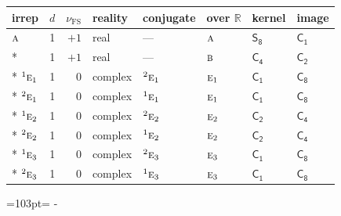 \documentclass[10pt,a4paper]{article}
\newcommand{\needspace}[1]{\par\penalty-100\begingroup\dimen0=#1\relax\dimen2=\pagegoal
  \advance\dimen2-\pagetotal\ifdim\dimen0>\dimen2\relax\ifdim\dimen2>0pt\vfil\break\fi\fi
  \endgroup}
\numberwithin{equation}{section}
\newcommand{\grp}[1]{\mathsf{#1}}
\newcommand{\irr}[1]{\text{\normalfont\scshape #1}}
\newcommand{\conjpair}[1]{{}^{#1}}
\newcommand{\detbox}[1]{{\setlength{\fboxsep}{1pt}\fbox{#1}}}
\newcommand{\fsind}{\nu_{\mathrm{FS}}}
\begin{document}
{\small\renewcommand{\arraystretch}{1.25}\setlength{\tabcolsep}{4pt}\begin{longtable}{@{}lrrlllll@{}}\toprule
irrep & $d$ & $\fsind$ & reality & conjugate & over $\mathbb{R}$ & kernel & image\\\midrule\endhead
\bottomrule\endfoot\endlastfoot
$\irr{a}$ & 1 & $+1$ & real & --- & $\irr{a}$ & \href{S8.pdf}{$\grp{S_{8}}$} & \href{C1.pdf}{$\grp{C_{1}}$}\\*
\detbox{$\irr{b}$} & 1 & $+1$ & real & --- & $\irr{b}$ & \href{C4.pdf}{$\grp{C_{4}}$} & \href{C2.pdf}{$\grp{C_{2}}$}\\*
$\conjpair{1}\irr{e}_{1}$ & 1 & $0$ & complex & $\conjpair{2}\irr{e}_{1}$ & $\irr{e}_{1}$ & \href{C1.pdf}{$\grp{C_{1}}$} & \href{C8.pdf}{$\grp{C_{8}}$}\\*
$\conjpair{2}\irr{e}_{1}$ & 1 & $0$ & complex & $\conjpair{1}\irr{e}_{1}$ & $\irr{e}_{1}$ & \href{C1.pdf}{$\grp{C_{1}}$} & \href{C8.pdf}{$\grp{C_{8}}$}\\*
$\conjpair{1}\irr{e}_{2}$ & 1 & $0$ & complex & $\conjpair{2}\irr{e}_{2}$ & $\irr{e}_{2}$ & \href{C2.pdf}{$\grp{C_{2}}$} & \href{C4.pdf}{$\grp{C_{4}}$}\\*
$\conjpair{2}\irr{e}_{2}$ & 1 & $0$ & complex & $\conjpair{1}\irr{e}_{2}$ & $\irr{e}_{2}$ & \href{C2.pdf}{$\grp{C_{2}}$} & \href{C4.pdf}{$\grp{C_{4}}$}\\*
$\conjpair{1}\irr{e}_{3}$ & 1 & $0$ & complex & $\conjpair{2}\irr{e}_{3}$ & $\irr{e}_{3}$ & \href{C1.pdf}{$\grp{C_{1}}$} & \href{C8.pdf}{$\grp{C_{8}}$}\\*
$\conjpair{2}\irr{e}_{3}$ & 1 & $0$ & complex & $\conjpair{1}\irr{e}_{3}$ & $\irr{e}_{3}$ & \href{C1.pdf}{$\grp{C_{1}}$} & \href{C8.pdf}{$\grp{C_{8}}$}\\
\bottomrule\end{longtable}}
\needspace{103pt}
\end{document}
